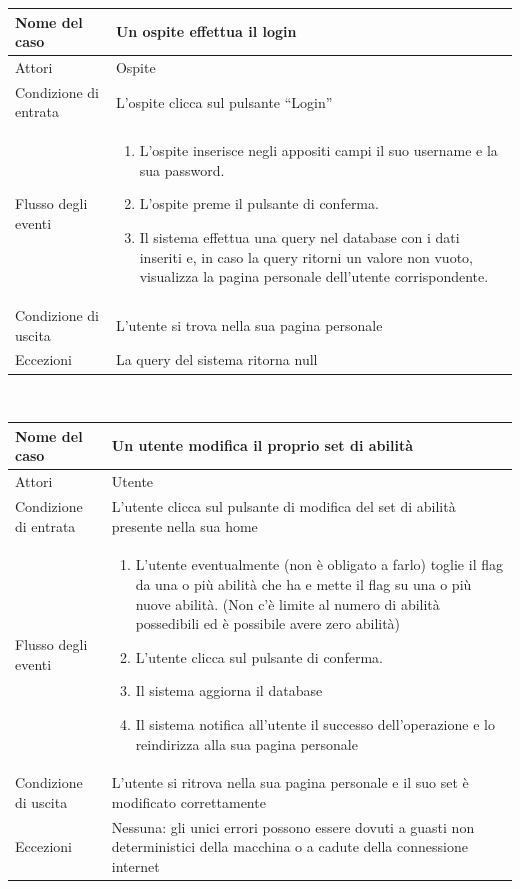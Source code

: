 \documentclass[a4paper,12pt]{article}
\begin{document}
\clearpage
\begin{tabularx}{\textwidth}{|l|X|}
\hline Nome del caso & Un ospite effettua il login \\
\hline Attori & Ospite \\ 
\hline Condizione di entrata & L'ospite clicca sul pulsante “Login” \\
\hline Flusso degli eventi & 
\begin{enumerate}
\itemsep0em 
\item L'ospite inserisce negli appositi campi il suo username e la sua password.
\item L'ospite preme il pulsante di conferma.
\item Il sistema effettua una query nel database con i dati inseriti e, in caso la query ritorni un valore non vuoto, visualizza la pagina personale dell'utente corrispondente.
\end{enumerate}
 \\ 
\hline Condizione di uscita & L'utente si trova nella sua pagina personale \\
\hline Eccezioni & La query del sistema ritorna null
\\
\hline 
\end{tabularx} \\[1\baselineskip]
\begin{tabularx}{\textwidth}{|l|X|}
\hline Nome del caso & Un utente modifica il proprio set di abilità \\
\hline Attori & Utente \\ 
\hline Condizione di entrata & L'utente clicca sul pulsante di modifica del set di abilità presente nella sua home \\
\hline Flusso degli eventi & 
\begin{enumerate}
\itemsep0em 
\item L'utente eventualmente (non è obligato a farlo) toglie il flag da una o più abilità che ha e mette il flag su una o più nuove abilità. (Non c'è limite al numero di abilità possedibili ed è possibile avere zero abilità)
\item L'utente clicca sul pulsante di conferma.
\item Il sistema aggiorna il database
\item Il sistema notifica all'utente il successo dell'operazione e lo reindirizza alla sua pagina personale
\end{enumerate}
 \\ 
\hline Condizione di uscita & L'utente si ritrova nella sua pagina personale e il suo set è modificato correttamente \\
\hline Eccezioni & Nessuna: gli unici errori possono essere dovuti a guasti non deterministici della macchina o a cadute della connessione internet
\\
\hline 
\end{tabularx} \clearpage
\end{document}
